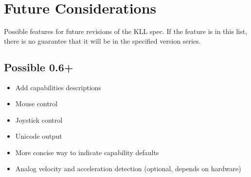 \documentclass{kiibohd-template}
\begin{document}
\newpage
\chapter{Future Considerations}

Possible features for future revisions of the KLL spec.
If the feature is in this list, there is no guarantee that it will be in the specified version series.

\section{Possible 0.6+}

\begin{itemize}
\item Add capabilities descriptions
\item Mouse control
\item Joystick control
\item Unicode output
\item More concise way to indicate capability defaults
\item Analog velocity and acceleration detection (optional, depends on hardware)
\end{itemize}
\end{document}
